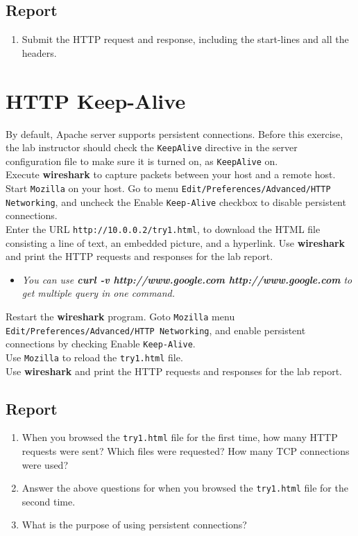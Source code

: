 \documentclass[10pt,a4paper]{article}
\numberwithin{equation}{section}
\numberwithin{figure}{section}
\numberwithin{table}{section}
\begin{document}
    \subsection*{Report}
    \begin{enumerate}
        \item Submit the HTTP request and response, including the start-lines and all the headers.
    \end{enumerate}

    \section{HTTP Keep-Alive}
    By default, Apache server supports persistent connections. Before this exercise, the lab instructor should check the \texttt{KeepAlive} directive in the server configuration file to make sure it is turned on, as \texttt{KeepAlive} on. \\
    Execute \textbf{wireshark} to capture packets between your host and a remote host. \\
    Start \texttt{Mozilla} on your host. Go to menu \texttt{Edit/Preferences/Advanced/HTTP Networking}, and uncheck the Enable \texttt{Keep-Alive} checkbox to disable persistent connections. \\
    Enter the URL \texttt{http://10.0.0.2/try1.html}, to download the HTML file consisting a line of text, an embedded picture, and a hyperlink.
    Use \textbf{wireshark} and print the HTTP requests and responses for the lab report.

    \begin{itemize}
        \item \textit{You can use \textbf{curl -v http://www.google.com http://www.google.com} to get multiple query in one command.}
    \end{itemize}

    Restart the \textbf{wireshark} program. Goto \texttt{Mozilla} menu \texttt{Edit/Preferences/Advanced/HTTP Networking}, and enable persistent connections by checking Enable \texttt{Keep-Alive}. \\
    Use \texttt{Mozilla} to reload the \texttt{try1.html} file. \\
    Use \textbf{wireshark} and print the HTTP requests and responses for the lab report.

    \subsection*{Report}
    \begin{enumerate}
        \item When you browsed the \texttt{try1.html} file for the first time, how many HTTP requests were sent?
        Which files were requested?
        How many TCP connections were used?
        \item Answer the above questions for when you browsed the \texttt{try1.html} file for the second time.
        \item What is the purpose of using persistent connections?
    \end{enumerate}
\end{document}
